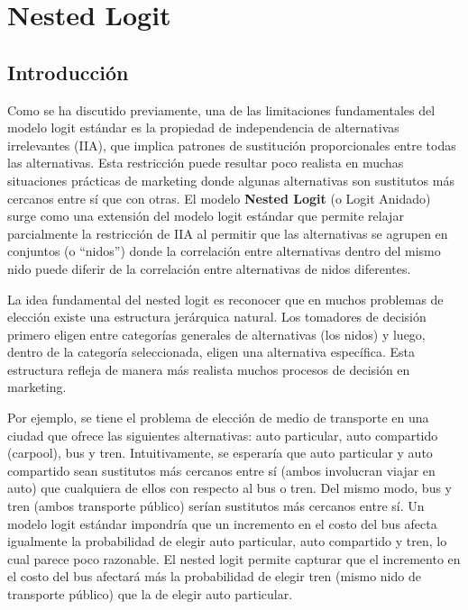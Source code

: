 \documentclass[
]{book}
\begin{document}
\section{Nested Logit}\label{nested-logit}

\subsection{Introducción}\label{introducciuxf3n-2}

Como se ha discutido previamente, una de las limitaciones fundamentales del modelo logit estándar es la propiedad de independencia de alternativas irrelevantes (IIA), que implica patrones de sustitución proporcionales entre todas las alternativas. Esta restricción puede resultar poco realista en muchas situaciones prácticas de marketing donde algunas alternativas son sustitutos más cercanos entre sí que con otras. El modelo \textbf{Nested Logit} (o Logit Anidado) surge como una extensión del modelo logit estándar que permite relajar parcialmente la restricción de IIA al permitir que las alternativas se agrupen en conjuntos (o ``nidos'') donde la correlación entre alternativas dentro del mismo nido puede diferir de la correlación entre alternativas de nidos diferentes.

La idea fundamental del nested logit es reconocer que en muchos problemas de elección existe una estructura jerárquica natural. Los tomadores de decisión primero eligen entre categorías generales de alternativas (los nidos) y luego, dentro de la categoría seleccionada, eligen una alternativa específica. Esta estructura refleja de manera más realista muchos procesos de decisión en marketing.

Por ejemplo, se tiene el problema de elección de medio de transporte en una ciudad que ofrece las siguientes alternativas: auto particular, auto compartido (carpool), bus y tren. Intuitivamente, se esperaría que auto particular y auto compartido sean sustitutos más cercanos entre sí (ambos involucran viajar en auto) que cualquiera de ellos con respecto al bus o tren. Del mismo modo, bus y tren (ambos transporte público) serían sustitutos más cercanos entre sí. Un modelo logit estándar impondría que un incremento en el costo del bus afecta igualmente la probabilidad de elegir auto particular, auto compartido y tren, lo cual parece poco razonable. El nested logit permite capturar que el incremento en el costo del bus afectará más la probabilidad de elegir tren (mismo nido de transporte público) que la de elegir auto particular.
\end{document}

